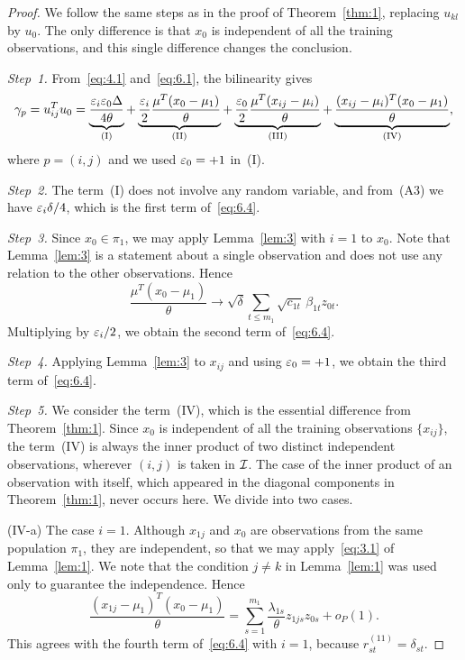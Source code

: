 \begin{proof}
We follow the same steps as in the proof of Theorem~\ref{thm:1}, replacing
$u_{kl}$ by $u_0$. The only difference is that $x_0$ is independent of all the
training observations, and this single difference changes the conclusion.

\textit{Step~1.} From~\eqref{eq:4.1} and~\eqref{eq:6.1}, the bilinearity gives
\begin{equation}
\gamma_p=u_{ij}^Tu_0
=\underbrace{\frac{\varepsilon_i\varepsilon_0\Delta}{4\theta}}_{\mathrm{(I)}}
+\underbrace{\frac{\varepsilon_i}{2}\frac{\mu^T(x_0-\mu_1)}{\theta}}_{\mathrm{(II)}}
+\underbrace{\frac{\varepsilon_0}{2}\frac{\mu^T(x_{ij}-\mu_i)}{\theta}}_{\mathrm{(III)}}
+\underbrace{\frac{(x_{ij}-\mu_i)^T(x_0-\mu_1)}{\theta}}_{\mathrm{(IV)}},
\label{eq:6.5}
\end{equation}
where $p=(i,j)$ and we used $\varepsilon_0=+1$ in~(I).

\textit{Step~2.} The term~(I) does not involve any random variable, and from~(A3)
we have $\varepsilon_i\delta/4$, which is the first term of~\eqref{eq:6.4}.

\textit{Step~3.} Since $x_0\in\pi_1$, we may apply Lemma~\ref{lem:3} with $i=1$ to
$x_0$. Note that Lemma~\ref{lem:3} is a statement about a single observation and
does not use any relation to the other observations. Hence
\[
\frac{\mu^T(x_0-\mu_1)}{\theta}
\longrightarrow\sqrt{\delta}\sum_{t\le m_1}\sqrt{c_{1t}}\,\beta_{1t}z_{0t}.
\]
Multiplying by $\varepsilon_i/2$, we obtain the second term of~\eqref{eq:6.4}.

\textit{Step~4.} Applying Lemma~\ref{lem:3} to $x_{ij}$ and using $\varepsilon_0=+1$, we
obtain the third term of~\eqref{eq:6.4}.

\textit{Step~5.} We consider the term~(IV), which is the essential difference from
Theorem~\ref{thm:1}. Since $x_0$ is independent of all the training observations
$\{x_{ij}\}$, the term~(IV) is always the inner product of two distinct independent
observations, wherever $(i,j)$ is taken in $\mathcal{I}$. The case of the inner product of
an observation with itself, which appeared in the diagonal components in
Theorem~\ref{thm:1}, never occurs here. We divide into two cases.

(IV-a) The case $i=1$. Although $x_{1j}$ and $x_0$ are observations from the same
population $\pi_1$, they are independent, so that we may apply~\eqref{eq:3.1} of
Lemma~\ref{lem:1}. We note that the condition $j\neq k$ in Lemma~\ref{lem:1} was
used only to guarantee the independence. Hence
\[
\frac{(x_{1j}-\mu_1)^T(x_0-\mu_1)}{\theta}
=\sum_{s=1}^{m_1}\frac{\lambda_{1s}}{\theta}z_{1js}z_{0s}+o_P(1).
\]
This agrees with the fourth term of~\eqref{eq:6.4} with $i=1$, because
$r_{st}^{(11)}=\delta_{st}$.


\end{proof}
